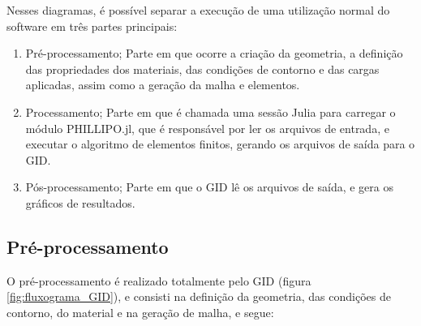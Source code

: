 Nesses diagramas, é possível separar a execução de uma utilização normal do software em três partes principais:

\begin{enumerate}
    \item Pré-processamento;
        Parte em que ocorre a criação da geometria, a definição das propriedades dos materiais, das condições de contorno e das cargas aplicadas, assim como a geração da malha e elementos.
    \item Processamento;
        Parte em que é chamada uma sessão Julia para carregar o módulo PHILLIPO.jl, que é responsável por ler os arquivos de entrada, e executar o algoritmo de elementos finitos, gerando os arquivos de saída para o GID.
    \item Pós-processamento;
        Parte em que o GID lê os arquivos de saída, e gera os gráficos de resultados.
\end{enumerate}

\subsection{Pré-processamento}

O pré-processamento é realizado totalmente pelo GID (figura \ref{fig:fluxograma_GID}), e consisti na definição da geometria, das condições de contorno, do material e na geração de malha, e segue:

